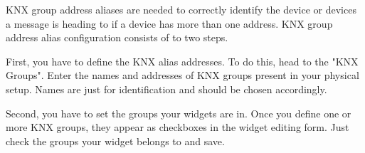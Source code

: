   KNX group address aliases are needed to correctly identify the device or devices a message is heading to if a device has more than one address. KNX group address alias configuration consists of to two steps.

  First, you have to define the KNX alias addresses. To do this, head to the "KNX Groups". Enter the names and addresses of KNX groups present in your physical setup. Names are just for identification and should be chosen accordingly.

  Second, you have to set the groups your widgets are in. Once you define one or more KNX groups, they appear as checkboxes in the widget editing form. Just check the groups your widget belongs to and save.

